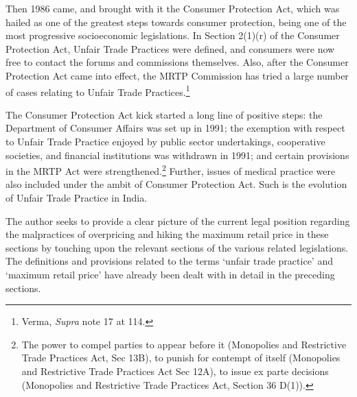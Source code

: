 \begin{multicols}{2}
\vspace{-.15cm}

\noi
Then 1986 came, and brought with it the Consumer Protection Act, which was hailed as one of
the greatest steps towards consumer protection, being one of the most progressive socioeconomic legislations. In Section 2(1)(r) of the Consumer Protection Act, Unfair Trade Practices
were defined, and consumers were now free to contact the forums and commissions
themselves. Also, after the Consumer Protection Act came into effect, the MRTP Commission
has tried a large number of cases relating to Unfair Trade Practices.\footnote{Verma, \textit{Supra} note 17 at 114.}

\vspace{-.15cm}

\noi
The Consumer Protection Act kick started a long line of positive steps: the Department of
Consumer Affairs was set up in 1991; the exemption with respect to Unfair Trade Practice
enjoyed by public sector undertakings, cooperative societies, and financial institutions was
withdrawn in 1991; and certain provisions in the MRTP Act were strengthened.\footnote{The power to compel parties to appear before it (Monopolies and Restrictive Trade Practices Act, Sec 13B),
to punish for contempt of itself (Monopolies and Restrictive Trade Practices Act Sec 12A), to issue ex parte decisions (Monopolies and Restrictive Trade Practices Act, Section 36 D(1)).} Further, issues of medical practice were also included under the ambit of Consumer Protection Act.
Such is the evolution of Unfair Trade Practice in India.


\vspace{.15cm}



\vspace{.15cm}

\noi
The author seeks to provide a clear picture of the current legal position regarding the
malpractices of overpricing and hiking the maximum retail price in these sections by touching
upon the relevant sections of the various related legislations. The definitions and provisions
related to the terms ‘unfair trade practice’ and ‘maximum retail price’ have already been dealt
with in detail in the preceding sections.


\end{multicols}
